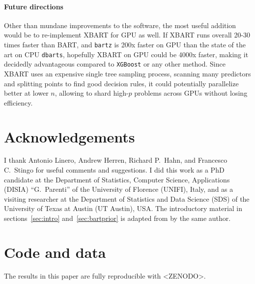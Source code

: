 \documentclass{article}
\begin{document}
    \paragraph{Future directions}

    Other than mundane improvements to the software, the most useful addition would be to re-implement XBART \autocite{he2021} for GPU as well. If XBART runs overall 20-30 times faster than BART, and \texttt{bartz} is 200x faster on GPU than the state of the art on CPU \texttt{dbarts}, hopefully XBART on GPU could be 4000x faster, making it decidedly advantageous compared to \texttt{XGBoost} or any other method. Since XBART uses an expensive single tree sampling process, scanning many predictors and splitting points to find good decision rules, it could potentially parallelize better at lower $n$, allowing to shard high-$p$ problems across GPUs without losing efficiency.

    \section*{Acknowledgements}

    I thank Antonio Linero, Andrew Herren, Richard P.\ Hahn, and Francesco C.\ Stingo for useful comments and suggestions. I did this work as a PhD candidate at the Department of Statistics, Computer Science, Applications (DISIA) ``G.~Parenti'' of the University of Florence (UNIFI), Italy, and as a visiting researcher at the Department of Statistics and Data Science (SDS) of the University of Texas at Austin (UT Austin), USA. The introductory material in sections~\ref{sec:intro} and~\ref{sec:bartprior} is adapted from \textcite{petrillo2024d} by the same author.

    \section*{Code and data}

    The results in this paper are fully reproducible with \textless ZENODO\textgreater.

    \printbibliography
\end{document}
